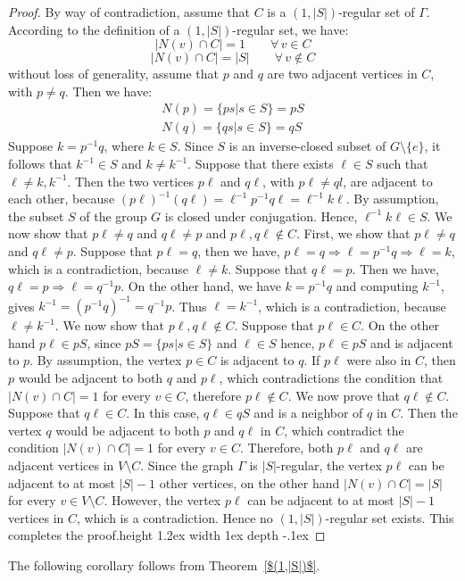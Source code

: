\documentclass[12pt]{article}
\def\bull{\vrule height 1.2ex width 1ex depth -.1ex }
\begin{document}
\begin{proof}
	By way of contradiction, assume that $C$ is a $(1,|S|)$-regular set of $\Gamma$. According to the definition of a $(1,|S|)$-regular set, we have:
	\[
	|N(v)\cap C| = 1 \qquad \forall\, v \in C
	\]
	\[
	|N(v)\cap C| = |S| \qquad \forall\, v \notin C
	\]
	without loss of generality, assume that $p$ and $q$ are two adjacent vertices in $C$, with $p\neq q$. Then we have:
	\begin{align*}
	 N(p)=\lbrace ps |s \in S\rbrace = pS\\
	 N(q)=\lbrace qs |s \in S\rbrace = qS
	 \end{align*}
	Suppose $k = p^{-1} q$, where $k\in S$. Since $S$ is an inverse-closed subset of $G \setminus \lbrace e \rbrace$, it follows that $k^{-1} \in S$ and $k \neq k^{-1}$.  Suppose that there exists $\ell \in S$ such that $\ell \neq k, k^{-1}$. Then the two vertices $p\ell$ and $q\ell$, with $p\ell \neq ql$, are adjacent to each other, because $(p\ell)^{-1} (q\ell) = \ell ^ {-1} p^{-1} q\ell = \ell ^{-1} k \ell$. By assumption, the subset $S$ of the group $G$ is closed under conjugation. Hence, $\ell ^{-1} k \ell \in S$. We now show that $p\ell \neq q$ and $q\ell \neq p$ and $p\ell, q\ell \notin C$. First, we show that $p\ell \neq q$ and $q\ell \neq p$. Suppose that $p\ell = q$, then we have, $p\ell = q \Rightarrow \ell = p^{-1} q \Rightarrow \ell = k $, which is a contradiction, because $\ell \neq k $. Suppose that $q\ell =p$. Then we have, $q\ell = p \Rightarrow \ell = q^{-1} p$. On the other hand, we have $k = p^{-1} q$ and computing $k^{-1}$, gives $k^{-1}=(p^{-1} q) ^{-1} = q^{-1} p$. Thus $\ell = k^{-1}$, which is a contradiction, because $\ell \neq k ^{-1}$. We now show that $p\ell, q\ell \notin C $. Suppose that $p\ell \in C$. On the other hand $p\ell \in pS$, since $pS = \lbrace ps |s \in S\rbrace$ and $\ell \in S$ hence, $p\ell \in pS$ and is adjacent to $p$. By assumption, the vertex $p\in C$ is adjacent to $q$. If $p\ell$ were also in $C$, then $p$ would be adjacent to both $q$ and $p\ell$, which contradictions the condition that $ |N(v)\cap C| = 1 $ for every $v \in C$, therefore $p\ell \notin C$. We now prove that $q\ell \notin C$. Suppose that $q\ell \in C$. In this case, $q\ell \in qS$ and is a neighbor of $q$ in $C$. Then the vertex $q$ would be adjacent to both $p$ and $q\ell$ in $C$, which contradict the condition $ |N(v)\cap C| = 1 $ for every $v \in C$. Therefore, both $p\ell$ and $q\ell$ are adjacent vertices in $V \setminus C$. Since the graph $\Gamma$ is $|S|$-regular, the vertex $p \ell$ can be adjacent to at most $|S|-1$ other vertices, on the other hand $ |N(v)\cap C| = |S| $ for every $v \in V \setminus C $. However, the vertex $p\ell$ can be adjacent to at most $|S|-1$ vertices in $C$, which is a contradiction. Hence no $(1,|S|)$-regular set exists. This completes the proof.\hfill\bull
	\end{proof}
The following corollary follows from Theorem~\ref{$(1,|S|)$}.
\end{document}
